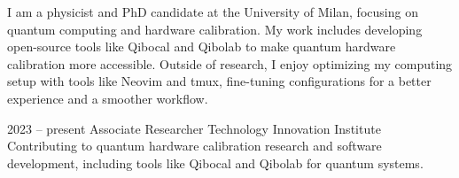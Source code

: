 \documentclass[9pt]{developercv} %
\begin{document}


\begin{minipage}[t]{0.4\textwidth} %
	\vspace{-\baselineskip} %
	
	I am a physicist and PhD candidate at the University of Milan, focusing on 
    quantum computing and hardware calibration.
    My work includes developing open-source tools like Qibocal and Qibolab 
    to make quantum hardware calibration more accessible. Outside of research, 
    I enjoy optimizing my computing setup with tools like Neovim and tmux, 
    fine-tuning configurations for a better experience and a smoother workflow.
\end{minipage}
\hfill %
\begin{minipage}[t]{0.5\textwidth} %
	\vspace{-\baselineskip} %
	
	\begin{barchart}{5.5} %
	\end{barchart}
\end{minipage}

\begin{center}
\end{center}



\begin{entrylist}
	\entry
		{2023 -- present}
		{Associate Researcher}
		{Technology Innovation Institute}
		{Contributing to quantum hardware calibration research and software development, 
        including tools like Qibocal and Qibolab for quantum systems.}
\end{entrylist}
\end{document}
